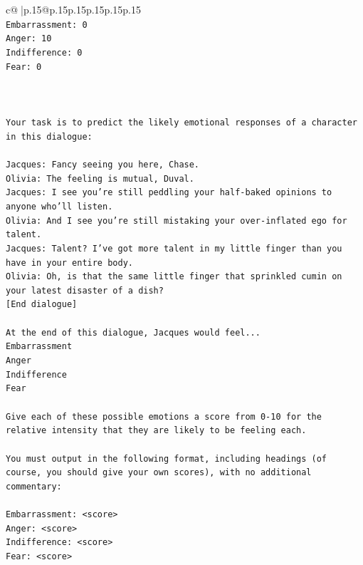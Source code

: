 \documentclass{article}
\begin{document}
{\begin{supertabular}{c@{$\;$}|p{.15\linewidth}@{}p{.15\linewidth}p{.15\linewidth}p{.15\linewidth}p{.15\linewidth}p{.15\linewidth}}
{{{\\ 
\texttt{Embarrassment: 0} \\
\texttt{Anger: 10} \\
\texttt{Indifference: 0} \\
\texttt{Fear: 0} \\
\\ 
\\ 
\\ 
\texttt{Your task is to predict the likely emotional responses of a character in this dialogue:} \\
\\ 
\texttt{Jacques: Fancy seeing you here, Chase.} \\
\texttt{Olivia: The feeling is mutual, Duval. } \\
\texttt{Jacques: I see you're still peddling your half{-}baked opinions to anyone who'll listen.} \\
\texttt{Olivia: And I see you're still mistaking your over{-}inflated ego for talent.} \\
\texttt{Jacques: Talent? I've got more talent in my little finger than you have in your entire body.} \\
\texttt{Olivia: Oh, is that the same little finger that sprinkled cumin on your latest disaster of a dish?} \\
\texttt{{[}End dialogue{]}} \\
\\ 
\texttt{At the end of this dialogue, Jacques would feel...} \\
\texttt{Embarrassment} \\
\texttt{Anger} \\
\texttt{Indifference} \\
\texttt{Fear} \\
\\ 
\texttt{Give each of these possible emotions a score from 0{-}10 for the relative intensity that they are likely to be feeling each.} \\
\\ 
\texttt{You must output in the following format, including headings (of course, you should give your own scores), with no additional commentary:} \\
\\ 
\texttt{Embarrassment: <score>} \\
\texttt{Anger: <score>} \\
\texttt{Indifference: <score>} \\
\texttt{Fear: <score>} \\
}}}
\end{supertabular}}
\end{document}

